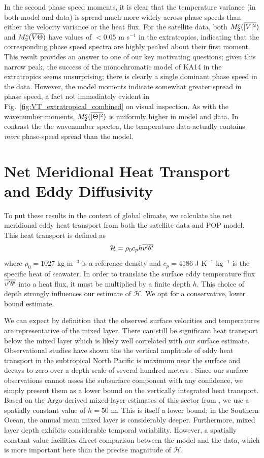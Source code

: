 \documentclass[10pt]{article}
\newcommand{\ol}{\ensuremath{\overline}}
\begin{document}
In the second phase speed moments, it is clear that the temperature variance (in both model and data) is spread much more widely across phase speeds than either the velocity variance or the heat flux. For the satellite data, both $M_2^c(\ol{|V|^2})$ and $M_2^c(\ol{V\Theta})$ have values of $< 0.05$ m s$^{-1}$ in the extratropics, indicating that the corresponding phase speed spectra are highly peaked about their first moment. This result provides an answer to one of our key motivating questions; given this narrow peak, the success of the monochromatic model of KA14 in the extratropics seems unsurprising; there is clearly a single dominant phase speed in the data. However, the model moments indicate somewhat greater spread in phase speed, a fact not immediately evident in Fig.~\ref{fig:VT_extratropical_combined} on visual inspection. As with the wavenumber moments, $M_2^c(\ol{|\Theta|^2})$ is uniformly higher in model and data. In contrast the the wavenumber spectra, the temperature data actually contains {\em more} phase-speed spread than the model.

\section{Net Meridional Heat Transport and Eddy Diffusivity}

To put these results in the context of global climate, we calculate the net meridional eddy heat transport from both the satellite data and POP model. This heat transport is defined as
\begin{equation}
\mathcal{H} = \rho_0 c_p h \ol{v'\theta'}
\label{eq:H}
\end{equation}
where $\rho_0 = 1027$ kg m$^{-3}$ is a reference density and $c_p = 4186$ J K$^{-1}$ kg$^{-1}$ is the specific heat of seawater. In order to translate the surface eddy temperature flux $\ol{v'\theta'}$ into a heat flux, it must be multiplied by a finite depth $h$. This choice of depth strongly influences our estimate of $\mathcal{H}$. We opt for a conservative, lower bound estimate.

We can expect by definition that the observed surface velocities and temperatures are representative of the mixed layer. There can still be significant heat transport below the mixed layer which is likely well correlated with our surface estimate. Observational studies have shown the the vertical amplitude of eddy heat transport in the subtropical North Pacific is maximum near the surface and decays to zero over a depth scale of several hundred meters \citep{RoemmichGilson2001,QiuEtAl2005}. Since our surface observations cannot asses the subsurface component with any confidence, we simply present them as a lower bound on the vertically integrated heat transport. Based on the Argo-derived mixed-layer estimates of this sector from \citet{HolteTalley2009}, we use a spatially constant value of $h = 50$ m. This is itself a lower bound; in the Southern Ocean, the annual mean mixed layer is considerably deeper. Furthermore, mixed layer depth exhibits considerable temporal variability. However, a spatially constant value facilities direct comparison between the model and the data, which is more important here than the precise magnitude of $\mathcal{H}$.
\end{document}
